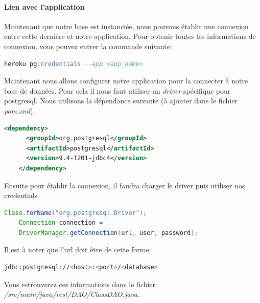 \documentclass{article}
\begin{document}
	\paragraph{Lien avec l'application}
	  Maintenant que notre base est instanciée, nous pouvons établir une connexion entre cette dernière et notre application.
	  Pour obtenir toutes les informations de connexion, vous pouvez entrer la commande suivante:
	  \begin{lstlisting}[language=sql]
    heroku pg:credentials --app <app_name>
	  \end{lstlisting}
	  Maintenant nous allons configurer notre application pour la connecter à notre base de données. Pour cela il nous faut utiliser un \emph{driver} spécifique pour postgresql. 
	  Nous utilisons la dépendance suivante (à ajouter dans le fichier \emph{pom.xml}).
	  \begin{lstlisting}[language=xml]
    <dependency>
      <groupId>org.postgresql</groupId>
      <artifactId>postgresql</artifactId>
      <version>9.4-1201-jdbc4</version>
    </dependency>
	  \end{lstlisting}
	  Ensuite pour établir la connexion, il faudra charger le driver puis utiliser nos credentials.
	  \begin{lstlisting}[language=java]
    Class.forName("org.postgresql.Driver");
    Connection connection =  
	DriverManager.getConnection(url, user, password);
	  \end{lstlisting}
	  Il est à noter que l'url doit être de cette forme:
	  \begin{lstlisting}[language=bash]
    jdbc:postgresql://<host>:<port>/<database>
	  \end{lstlisting}
	  Vous retrouverez ces informations dans le fichier \emph{/src/main/java/rest/DAO/ClassDAO.java}.
\end{document}

